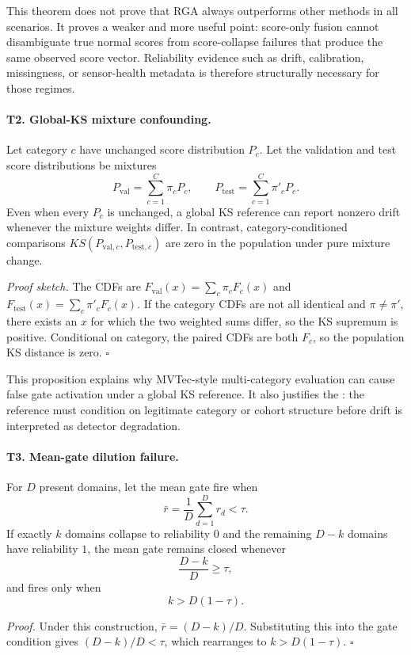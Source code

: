 \documentclass[11pt]{article}
\newcommand{\method}{RGA}
\begin{document}
This theorem does not prove that \method{} always outperforms other methods in all scenarios. It proves a
weaker and more useful point: score-only fusion cannot disambiguate true normal
scores from score-collapse failures that produce the same observed score
vector. Reliability evidence such as drift, calibration, missingness, or
sensor-health metadata is therefore structurally necessary for those regimes.

\paragraph{T2. Global-KS mixture confounding.}
Let category $c$ have unchanged score distribution $P_c$. Let the validation
and test score distributions be mixtures
\[
  P_{\mathrm{val}}=\sum_{c=1}^{C}\pi_c P_c,\qquad
  P_{\mathrm{test}}=\sum_{c=1}^{C}\pi'_c P_c.
\]
Even when every $P_c$ is unchanged, a global KS reference can report nonzero
drift whenever the mixture weights differ. In contrast, category-conditioned
comparisons $KS(P_{\mathrm{val},c},P_{\mathrm{test},c})$ are zero in the
population under pure mixture change.

\emph{Proof sketch.} The CDFs are
$F_{\mathrm{val}}(x)=\sum_c\pi_cF_c(x)$ and
$F_{\mathrm{test}}(x)=\sum_c\pi'_cF_c(x)$. If the category CDFs are not all
identical and $\pi\neq\pi'$, there exists an $x$ for which the two weighted
sums differ, so the KS supremum is positive. Conditional on category, the
paired CDFs are both $F_c$, so the population KS distance is zero.
\hfill$\square$

This proposition explains why MVTec-style multi-category evaluation can cause
false gate activation under a global KS reference. It also justifies the
: the reference must condition on
legitimate category or cohort structure before drift is interpreted as
detector degradation.

\paragraph{T3. Mean-gate dilution failure.}
For $D$ present domains, let the mean gate fire when
\[
  \bar r=\frac{1}{D}\sum_{d=1}^{D}r_d < \tau.
\]
If exactly $k$ domains collapse to reliability $0$ and the remaining
$D-k$ domains have reliability $1$, the mean gate remains closed whenever
\[
  \frac{D-k}{D}\geq \tau,
\]
and fires only when
\[
  k>D(1-\tau).
\]

\emph{Proof.} Under this construction, $\bar r=(D-k)/D$. Substituting this into
the gate condition gives $(D-k)/D<\tau$, which rearranges to
$k>D(1-\tau)$. \hfill$\square$
\end{document}
